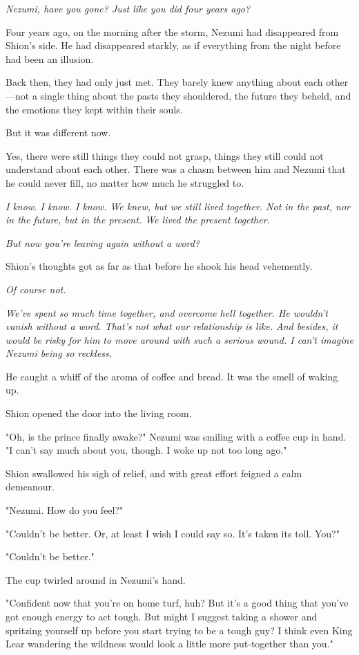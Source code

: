 \emph{Nezumi, have you gone? Just like you did four years ago?}

Four years ago, on the morning after the storm, Nezumi had disappeared
from Shion's side. He had disappeared starkly, as if everything from the
night before had been an illusion.

Back then, they had only just met. They barely knew anything about each
other---not a single thing about the pasts they shouldered, the future
they beheld, and the emotions they kept within their souls.

But it was different now.

Yes, there were still things they could not grasp, things they still
could not understand about each other. There was a chasm between him and
Nezumi that he could never fill, no matter how much he struggled to.

\emph{I know. I know. I know. We knew, but we still lived together. Not in the
past, nor in the future, but in the present. We lived the present
together.}

\emph{But now you're leaving again without a word?}

Shion's thoughts got as far as that before he shook his head vehemently.

\emph{Of course not.}

\emph{We've spent so much time together, and overcome hell together.
He wouldn't vanish without a word. That's not what our relationship is
like. And besides, it would be risky for him to move around with such a
serious wound. I can't imagine Nezumi being so reckless.}

He caught a whiff of the aroma of coffee and bread. It was the smell of
waking up.

Shion opened the door into the living room.

"Oh, is the prince finally awake?" Nezumi was smiling with a coffee cup
in hand. "I can't say much about you, though. I woke up not too long
ago."

Shion swallowed his sigh of relief, and with great effort feigned a calm
demeanour.

"Nezumi. How do you feel?"

"Couldn't be better. Or, at least I wish I could say so. It's taken its
toll. You?"

"Couldn't be better."

The cup twirled around in Nezumi's hand.

"Confident now that you're on home turf, huh? But it's a good thing that
you've got enough energy to act tough. But might I suggest taking a
shower and spritzing yourself up before you start trying to be a tough
guy? I think even King Lear wandering the wildness would look a little
more put-together than you."

